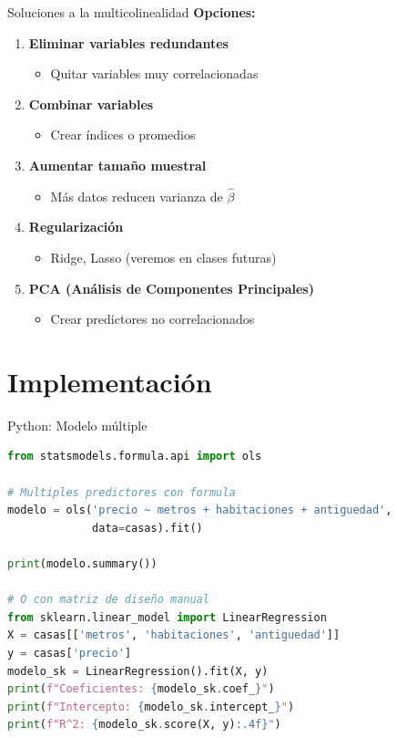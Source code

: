\documentclass[aspectratio=169]{beamer}
\begin{document}
\begin{frame}{Soluciones a la multicolinealidad}
\textbf{Opciones:}

\begin{enumerate}
    \item \textbf{Eliminar variables redundantes}
    \begin{itemize}
        \item Quitar variables muy correlacionadas
    \end{itemize}
    
    \item \textbf{Combinar variables}
    \begin{itemize}
        \item Crear índices o promedios
    \end{itemize}
    
    \item \textbf{Aumentar tamaño muestral}
    \begin{itemize}
        \item Más datos reducen varianza de $\hat{\beta}$
    \end{itemize}
    
    \item \textbf{Regularización}
    \begin{itemize}
        \item Ridge, Lasso (veremos en clases futuras)
    \end{itemize}
    
    \item \textbf{PCA (Análisis de Componentes Principales)}
    \begin{itemize}
        \item Crear predictores no correlacionados
    \end{itemize}
\end{enumerate}
\end{frame}

\section{Implementación}

\begin{frame}[fragile]{Python: Modelo múltiple}
\begin{lstlisting}[language=Python]
from statsmodels.formula.api import ols

# Multiples predictores con formula
modelo = ols('precio ~ metros + habitaciones + antiguedad',
             data=casas).fit()

print(modelo.summary())

# O con matriz de diseño manual
from sklearn.linear_model import LinearRegression
X = casas[['metros', 'habitaciones', 'antiguedad']]
y = casas['precio']
modelo_sk = LinearRegression().fit(X, y)
print(f"Coeficientes: {modelo_sk.coef_}")
print(f"Intercepto: {modelo_sk.intercept_}")
print(f"R^2: {modelo_sk.score(X, y):.4f}")
\end{lstlisting}
\end{frame}
\end{document}
